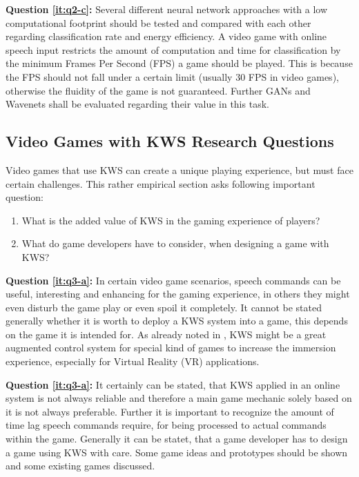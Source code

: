 \textbf{Question \ref{it:q2-c}:}
Several different neural network approaches with a low computational footprint should be tested and compared with each other regarding classification rate and energy efficiency. 
A video game with online speech input restricts the amount of computation and time for classification by the minimum Frames Per Second (FPS) a game should be played.
This is because the FPS should not fall under a certain limit (usually 30 FPS in video games), otherwise the fluidity of the game is not guaranteed.
Further GANs and Wavenets shall be evaluated regarding their value in this task.



\subsection{Video Games with KWS Research Questions}\label{sec:intro_rq_games}
Video games that use KWS can create a unique playing experience, but must face certain challenges.
This rather empirical section asks following important question:

\begin{enumerate}[label={Q.3.\alph*)}, leftmargin=1.75cm]
  \item What is the added value of KWS in the gaming experience of players?\label{it:q3-a}
  \item What do game developers have to consider, when designing a game with KWS?\label{it:q3-b}
\end{enumerate}
\noindent
\textbf{Question \ref{it:q3-a}:}
In certain video game scenarios, speech commands can be useful, interesting and enhancing for the gaming experience, in others they might even disturb the game play or even spoil it completely.
It cannot be stated generally whether it is worth to deploy a KWS system into a game, this depends on the game it is intended for.
As already noted in , KWS might be a great augmented control system for special kind of games to increase the immersion experience, especially for Virtual Reality (VR) applications.

\textbf{Question \ref{it:q3-a}:} It certainly can be stated, that KWS applied in an online system is not always reliable and therefore a main game mechanic solely based on it is not always preferable.
Further it is important to recognize the amount of time lag speech commands require, for being processed to actual commands within the game.
Generally it can be statet, that a game developer has to design a game using KWS with care.
Some game ideas and prototypes should be shown and some existing games discussed.